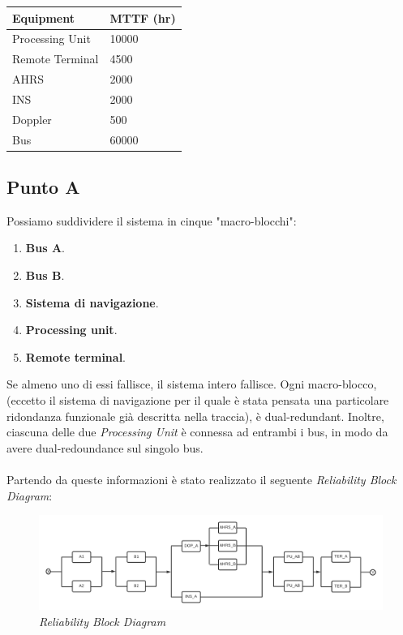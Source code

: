 \begin{table}
\centering
\begin{tabular}{|l|l|}
	\hline
	Equipment & MTTF (hr) \\
	\hline
	\hline
	Processing Unit & 10000 \\
	Remote Terminal & 4500 \\
	AHRS & 2000 \\
	INS & 2000 \\ 
	Doppler & 500 \\
	Bus & 60000 \\
	\hline
\end{tabular}
\end{table}
\subsection{Punto A}
Possiamo suddividere il sistema in cinque "macro-blocchi":
\begin{enumerate}
	\item \textbf{Bus A}.
	\item \textbf{Bus B}.
	\item \textbf{Sistema di navigazione}.
	\item \textbf{Processing unit}.
	\item \textbf{Remote terminal}.
\end{enumerate}
Se almeno uno di essi fallisce, il sistema intero fallisce. Ogni macro-blocco, (eccetto il sistema di navigazione per il quale è stata pensata una particolare ridondanza funzionale già descritta nella traccia), è dual-redundant. Inoltre, ciascuna delle due \textit{Processing Unit} è connessa ad entrambi i bus, in modo da avere dual-redoundance sul singolo bus. 
\\
\\
Partendo da queste informazioni è stato realizzato il seguente \textit{Reliability Block Diagram}:
\begin{figure}[H]
	\label{RBD}
	\centering
	\includegraphics[width=\textwidth]{img/hw5/es5_RBD.png}
	\caption{\textit{Reliability Block Diagram}}
\end{figure}
\newpage

